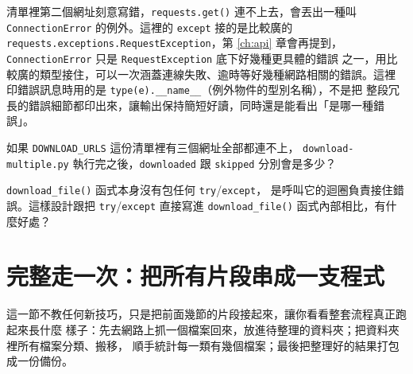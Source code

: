 
清單裡第二個網址刻意寫錯，\texttt{requests.get()} 連不上去，會丟出一種叫
\texttt{ConnectionError} 的例外。這裡的 \texttt{except} 接的是比較廣的
\texttt{requests.exceptions.RequestException}，第 \ref{ch:api} 章會再提到，
\texttt{ConnectionError} 只是 \texttt{RequestException} 底下好幾種更具體的錯誤
之一，用比較廣的類型接住，可以一次涵蓋連線失敗、逾時等好幾種網路相關的錯誤。這裡
印錯誤訊息時用的是 \texttt{type(e).\_\_name\_\_}（例外物件的型別名稱），不是把
整段冗長的錯誤細節都印出來，讓輸出保持簡短好讀，同時還是能看出「是哪一種錯誤」。

\begin{drills}[label=drills:download-multiple]
\item 如果 \texttt{DOWNLOAD\_URLS} 這份清單裡有三個網址全部都連不上，
\texttt{download-multiple.py} 執行完之後，\texttt{downloaded} 跟 \texttt{skipped}
分別會是多少？
\item \texttt{download\_file()} 函式本身沒有包任何 \texttt{try}/\texttt{except}，
是呼叫它的迴圈負責接住錯誤。這樣設計跟把 \texttt{try}/\texttt{except} 直接寫進
\texttt{download\_file()} 函式內部相比，有什麼好處？
\end{drills}

\section{完整走一次：把所有片段串成一支程式}
\label{sec:full-integration}

這一節不教任何新技巧，只是把前面幾節的片段接起來，讓你看看整套流程真正跑起來長什麼
樣子：先去網路上抓一個檔案回來，放進待整理的資料夾；把資料夾裡所有檔案分類、搬移，
順手統計每一類有幾個檔案；最後把整理好的結果打包成一份備份。

